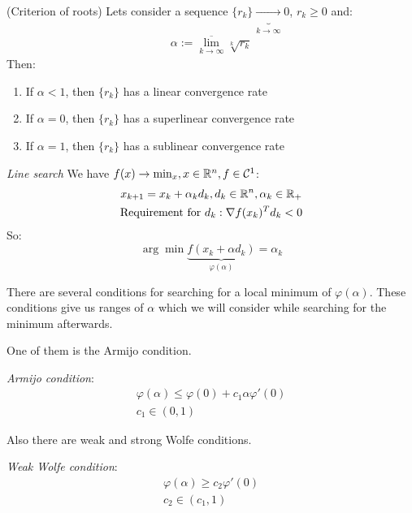 \begin{theorem} (Criterion of roots) Lets consider a sequence $\{r_k\} \underbrace{\longrightarrow}_{k \to \infty} 0$, $r_k \geqslant 0$ and:
\begin{gather*}
  \alpha := \overline{\lim_{k \to \infty}} \sqrt[k]{r_k}
\end{gather*}
Then: 
\begin{enumerate}
  \item If $\alpha < 1$, then $\{r_k\}$ has a linear convergence rate
  \item If $\alpha = 0$, then $\{r_k\}$ has a superlinear convergence rate
  \item If $\alpha = 1$, then $\{r_k\}$ has a sublinear convergence rate
\end{enumerate}
\end{theorem}

\begin{definition} \textit{Line search} We have $f(x) \to \min_{x}, x \in \mathbb{R}^n, f \in \mathcal{C}^1$:
\begin{gather*}
  x_{k+1} = x_k + \alpha_k d_k, d_k \in \mathbb{R}^n, \alpha_k \in \mathbb{R}_+ \\ 
  \text{Requirement for } d_k: \nabla f(x_k)^T d_k < 0
\end{gather*}
So: 
$$
  \arg \min \underbrace{f(x_k + \alpha d_k)}_{\varphi(\alpha)} = \alpha_k
$$
\end{definition}

There are several conditions for searching for a local minimum of $\varphi(\alpha)$. These conditions give us ranges of $\alpha$ which we will consider while searching for the minimum afterwards.

One of them is the Armijo condition.
\begin{definition} \textit{Armijo condition}:
\begin{gather*}
  \varphi(\alpha) \leqslant \varphi(0) + c_1 \alpha \varphi'(0) \\
  c_1 \in (0, 1)
\end{gather*}
\end{definition}

Also there are weak and strong Wolfe conditions.
\begin{definition} \textit{Weak Wolfe condition}:
\begin{gather*}
  \varphi(\alpha) \geqslant c_2 \varphi'(0) \\
  c_2 \in (c_1, 1)
\end{gather*}
\end{definition}

